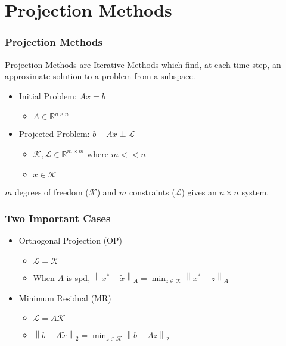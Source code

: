 \documentclass{beamer}
\begin{document}
    \section{Projection Methods}

    \begin{frame}
      \frametitle{Projection Methods}
      Projection Methods are Iterative Methods which find, at each time step, an approximate solution to a problem from a subspace.

      \begin{itemize}
        \item Initial Problem: $Ax = b$
          \begin{itemize}
            \item $A \in \mathbb{R}^{n \times n}$
          \end{itemize}
        \item Projected Problem: $b-A \widetilde{x} \perp \mathcal{L}$
          \begin{itemize}
            \item $\mathcal{K},\mathcal{L} \in \mathbb{R}^{m \times m}$ where $m < < n$
            \item $\widetilde{x} \in \mathcal{K}$
          \end{itemize}
      \end{itemize}
      $m$ degrees of freedom ($\mathcal{K}$) and $m$ constraints ($\mathcal{L}$) gives an $n \times n$ system.
    \end{frame}

    \begin{frame}
      \frametitle{Two Important Cases}
      \begin{itemize}
        \item Orthogonal Projection (OP)
          \begin{itemize}
            \item $\mathcal{L}=\mathcal{K}$ 
            \item When $A$ is spd,  $\left\| x^{*} - \widetilde{x} \right\|_{A} = \min_{z\in\mathcal{K}} \left\| x^{*} - z \right\|_{A}$
          \end{itemize}
        \item Minimum Residual (MR)
          \begin{itemize}
            \item $\mathcal{L} = A \mathcal{K}$ 
            \item $\left\| b - A \widetilde{x} \right\|_{2} = \min_{z \in \mathcal{K}}\left\| b - Az \right\|_{2}$
          \end{itemize}
      \end{itemize}
    \end{frame}
\end{document}
